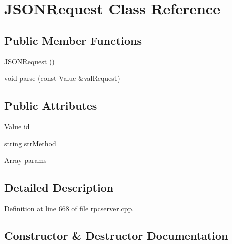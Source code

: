 \hypertarget{class_j_s_o_n_request}{}\section{J\+S\+O\+N\+Request Class Reference}
\label{class_j_s_o_n_request}
\subsection*{Public Member Functions}
\begin{DoxyCompactItemize}
\item 
\hyperlink{class_j_s_o_n_request_a2ce474cfc3eaec1ec8186e7625a2cceb}{J\+S\+O\+N\+Request} ()
\item 
void \hyperlink{class_j_s_o_n_request_a5c68b21e7f1bead9fd39f27208446add}{parse} (const \hyperlink{namespacejson__spirit_a28e6abc99fda7b06c430ca38802527a3}{Value} \&val\+Request)
\end{DoxyCompactItemize}
\subsection*{Public Attributes}
\begin{DoxyCompactItemize}
\item 
\hyperlink{namespacejson__spirit_a28e6abc99fda7b06c430ca38802527a3}{Value} \hyperlink{class_j_s_o_n_request_a511230ee04a067551bafd1ccd9462237}{id}
\item 
string \hyperlink{class_j_s_o_n_request_ace58495b259be69fb4b6e256a42c9d5f}{str\+Method}
\item 
\hyperlink{namespacejson__spirit_aee299e52bda3816039a53210cbbfea1a}{Array} \hyperlink{class_j_s_o_n_request_a92b1bcc9caa57cec01ccdb498a2b3666}{params}
\end{DoxyCompactItemize}


\subsection{Detailed Description}


Definition at line 668 of file rpcserver.\+cpp.



\subsection{Constructor \& Destructor Documentation}
\hypertarget{class_j_s_o_n_request_a2ce474cfc3eaec1ec8186e7625a2cceb}{}
